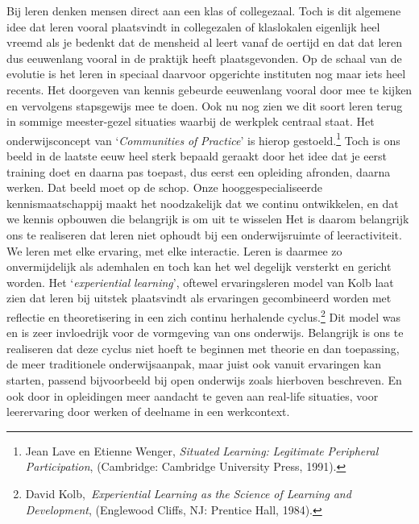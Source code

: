 \documentclass[smallauthor, chapterhaspagenum, nochapterinheader, pagenuminheader,  bigchapnum,medium2, tocpages,  garamond, titleinheader]{jote-book}
\begin{document}
	Bij leren denken mensen direct aan een klas of collegezaal. Toch is dit algemene idee dat leren vooral plaatsvindt in collegezalen of klaslokalen eigenlijk heel vreemd als je bedenkt dat de mensheid al leert vanaf de oertijd en dat dat leren dus eeuwenlang vooral in de praktijk heeft plaatsgevonden. Op de schaal van de evolutie is het leren in speciaal daarvoor opgerichte instituten nog maar iets heel recents. Het doorgeven van kennis gebeurde eeuwenlang vooral door mee te kijken en vervolgens stapsgewijs mee te doen. Ook nu nog zien we dit soort leren terug in sommige meester-gezel situaties waarbij de werkplek centraal staat. Het onderwijsconcept van ‘\emph{Communities}\emph{ of }\emph{Practice}' is hierop gestoeld.\footnote{Jean Lave en Etienne Wenger,\emph{ }\emph{Situated}\emph{ Learning: }\emph{Legitimate}\emph{ }\emph{Peripheral}\emph{ }\emph{Participation}, (Cambridge: Cambridge University Press, 1991). } Toch is ons beeld in de laatste eeuw heel sterk bepaald geraakt door het idee dat je eerst training doet en daarna pas toepast, dus eerst een opleiding afronden, daarna werken. Dat beeld moet op de schop. Onze hooggespecialiseerde kennismaatschappij maakt het noodzakelijk dat we continu ontwikkelen, en dat we kennis opbouwen die belangrijk is om uit te wisselen Het is daarom belangrijk ons te realiseren dat leren niet ophoudt bij een onderwijsruimte of leeractiviteit. We leren met elke ervaring, met elke interactie. Leren is daarmee zo onvermijdelijk als ademhalen en toch kan het wel degelijk versterkt en gericht worden. Het ‘\emph{experiential}\emph{ }\emph{learning}', oftewel ervaringsleren model van Kolb laat zien dat leren bij uitstek plaatsvindt als ervaringen gecombineerd worden met reflectie en theoretisering in een zich continu herhalende cyclus.\footnote{David Kolb, \emph{Experiential}\emph{ Learning as }\emph{the}\emph{ }\emph{Science}\emph{ of Learning }\emph{and}\emph{ Development}, (Englewood Cliffs, NJ: Prentice Hall, 1984).} Dit model was en is zeer invloedrijk voor de vormgeving van ons onderwijs. Belangrijk is ons te realiseren dat deze cyclus niet hoeft te beginnen met theorie en dan toepassing, de meer traditionele onderwijsaanpak, maar juist ook vanuit ervaringen kan starten, passend bijvoorbeeld bij open onderwijs zoals hierboven beschreven. En ook door in opleidingen meer aandacht te geven aan real-life situaties, voor leerervaring door werken of deelname in een werkcontext.
\end{document}
